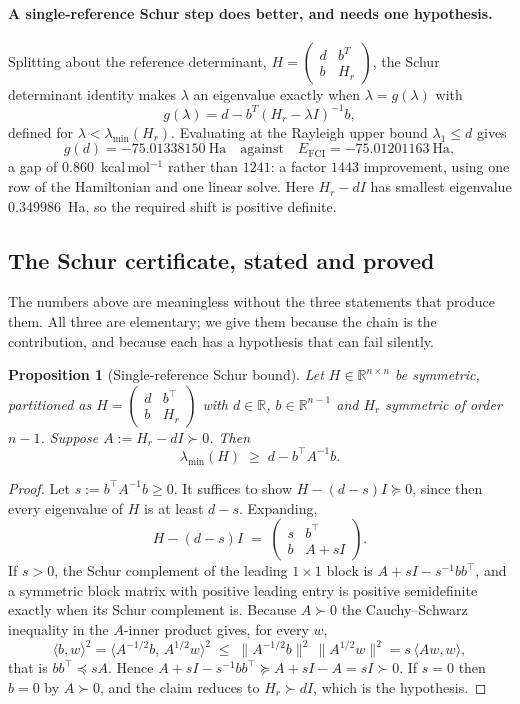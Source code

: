 \documentclass[11pt,a4paper]{article}
\theoremstyle{plain}
\newtheorem{proposition}[theorem]{Proposition}
\theoremstyle{definition}
\theoremstyle{remark}
\newcommand{\R}{\mathbb{R}}
\begin{document}
\paragraph{A single-reference Schur step does better, and needs one hypothesis.}
Splitting about the reference determinant, $H = \begin{pmatrix} d & b^T\\
b & H_r\end{pmatrix}$, the Schur determinant identity makes $\lambda$ an
eigenvalue exactly when $\lambda = g(\lambda)$ with
\[
  g(\lambda) = d - b^T (H_r-\lambda I)^{-1} b ,
\]
defined for $\lambda<\lambda_{\min}(H_r)$. Evaluating at the Rayleigh upper bound
$\lambda_1\le d$ gives
\[
  g(d) = -75.01338150\ \text{Ha}
  \quad\text{against}\quad
  E_{\mathrm{FCI}} = -75.01201163\ \text{Ha},
\]
a gap of $0.860$~kcal\,mol$^{-1}$ rather than $1241$: a factor $1443$ improvement,
using one row of the Hamiltonian and one linear solve. Here
$H_r-dI$ has smallest eigenvalue $0.349986$~Ha, so the required shift is positive
definite.

\subsection{The Schur certificate, stated and proved}
\label{sec:schur-proof}

The numbers above are meaningless without the three statements that produce them.
All three are elementary; we give them because the chain is the contribution, and
because each has a hypothesis that can fail silently.

\begin{proposition}[Single-reference Schur bound]
\label{prop:schur}
Let $H\in\R^{n\times n}$ be symmetric, partitioned as
$H=\begin{pmatrix} d & b^\top\\ b & H_r\end{pmatrix}$ with $d\in\R$,
$b\in\R^{n-1}$ and $H_r$ symmetric of order $n-1$. Suppose
$A := H_r - dI \succ 0$. Then
\[
  \lambda_{\min}(H) \;\ge\; d - b^\top A^{-1} b .
\]
\end{proposition}
\begin{proof}
Let $s := b^\top A^{-1}b \ge 0$. It suffices to show $H-(d-s)I \succeq 0$, since then
every eigenvalue of $H$ is at least $d-s$. Expanding,
\[
  H-(d-s)I \;=\;
  \begin{pmatrix} s & b^\top\\ b & A+sI\end{pmatrix}.
\]
If $s>0$, the Schur complement of the leading $1\times1$ block is
$A+sI - s^{-1}bb^\top$, and a symmetric block matrix with positive leading entry is
positive semidefinite exactly when its Schur complement is. Because $A\succ0$ the
Cauchy--Schwarz inequality in the $A$-inner product gives, for every $w$,
\[
  \langle b,w\rangle^{2}
  = \langle A^{-1/2}b,\,A^{1/2}w\rangle^{2}
  \;\le\; \|A^{-1/2}b\|^{2}\,\|A^{1/2}w\|^{2}
  = s\,\langle Aw,w\rangle,
\]
that is $bb^\top \preceq sA$. Hence
$A+sI-s^{-1}bb^\top \succeq A+sI-A = sI \succ 0$. If $s=0$ then $b=0$ by
$A\succ0$, and the claim reduces to $H_r\succ dI$, which is the hypothesis.
\end{proof}
\end{document}
